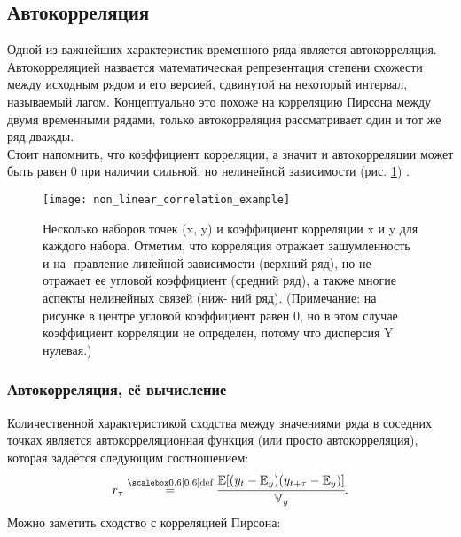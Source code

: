 \subsection{Автокорреляция}

Одной из важнейших характеристик временного ряда является автокорреляция. Автокорреляцией 
назвается математическая репрезентация степени \guillemotleft схожести\guillemotright {} между 
исходным рядом и его версией, сдвинутой на некоторый интервал, называемый лагом. Концептуально 
это похоже на корреляцию Пирсона между двумя временными рядами, только автокорреляция рассматривает 
один и тот же ряд дважды. \\

Стоит напомнить, что коэффициент корреляции, а значит и автокорреляции может быть равен 0 при наличии сильной, 
но нелинейной зависимости (рис. \ref{fig:non_linear_correlation_example}) \cite{pml1Book}.\\

\begin{figure}[h!]
    \centering
    \texttt{[image: non\_linear\_correlation\_example]}
    \caption{Несколько наборов точек (x, y) и коэффициент корреляции x и y
    для каждого набора. Отметим, что корреляция отражает зашумленность и на-
    правление линейной зависимости (верхний ряд), но не отражает ее угловой
    коэффициент (средний ряд), а также многие аспекты нелинейных связей (ниж-
    ний ряд). (Примечание: на рисунке в центре угловой коэффициент равен 0, но
    в этом случае коэффициент корреляции не определен, потому что дисперсия Y
    нулевая.)}
    \label{fig:non_linear_correlation_example}
\end{figure}

\subsubsection{Автокорреляция, её вычисление}

Количественной характеристикой сходства между значениями ряда в соседних точках является 
автокорреляционная функция (или просто автокорреляция), которая задаётся следующим соотношением:\\

\begin{equation*}
    r_\tau \defeq \cfrac{\mathbb{E}[(y_t - \mathbb{E}_y)(y_{t+\tau} - \mathbb{E}_y)]}{\mathbb{V}_y}.
\end{equation*}
Можно заметить сходство с корреляцией Пирсона:

